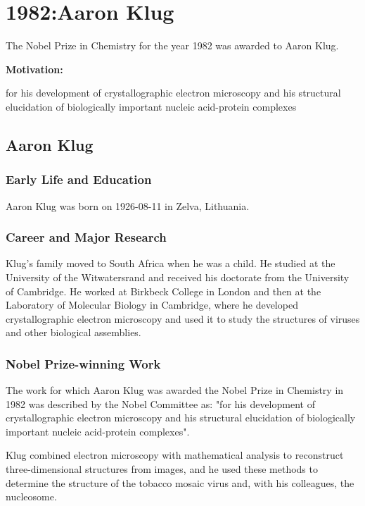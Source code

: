 \chapter{1982:Aaron Klug}

\label{chap:chemistry1982}

The Nobel Prize in Chemistry for the year 1982 was awarded to Aaron Klug.

\textbf{Motivation:}

for his development of crystallographic electron microscopy and his structural elucidation of biologically important nucleic acid-protein complexes

\section{Aaron Klug}

\subsection*{Early Life and Education}

Aaron Klug was born on 1926-08-11 in Zelva, Lithuania.

\subsection*{Career and Major Research}

Klug's family moved to South Africa when he was a child. He studied at the University of the Witwatersrand and received his doctorate from the University of Cambridge. He worked at Birkbeck College in London and then at the Laboratory of Molecular Biology in Cambridge, where he developed crystallographic electron microscopy and used it to study the structures of viruses and other biological assemblies.

\subsection*{Nobel Prize-winning Work}

The work for which Aaron Klug was awarded the Nobel Prize in Chemistry in 1982 was described by the Nobel Committee as: "for his development of crystallographic electron microscopy and his structural elucidation of biologically important nucleic acid-protein complexes".

Klug combined electron microscopy with mathematical analysis to reconstruct three-dimensional structures from images, and he used these methods to determine the structure of the tobacco mosaic virus and, with his colleagues, the nucleosome.

